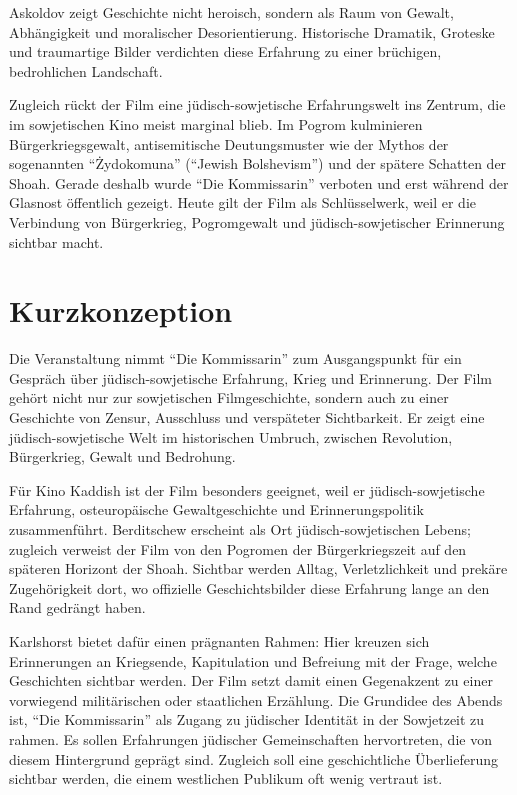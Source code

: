 \documentclass[11pt,a4paper]{article}
\begin{document}
Askoldov zeigt Geschichte nicht heroisch, sondern als Raum von Gewalt, Abh\"angigkeit und moralischer Desorientierung. Historische Dramatik, Groteske und traumartige Bilder verdichten diese Erfahrung zu einer br\"uchigen, bedrohlichen Landschaft.

Zugleich r\"uckt der Film eine j\"udisch-sowjetische Erfahrungswelt ins Zentrum, die im sowjetischen Kino meist marginal blieb. Im Pogrom kulminieren B\"urgerkriegsgewalt, antisemitische Deutungsmuster wie der Mythos der sogenannten \enquote{\.Zydokomuna} (\enquote{Jewish Bolshevism}) und der sp\"atere Schatten der Shoah. Gerade deshalb wurde \enquote{Die Kommissarin} verboten und erst w\"ahrend der Glasnost \"offentlich gezeigt. Heute gilt der Film als Schl\"usselwerk, weil er die Verbindung von B\"urgerkrieg, Pogromgewalt und j\"udisch-sowjetischer Erinnerung sichtbar macht.

\section*{Kurzkonzeption}

Die Veranstaltung nimmt \enquote{Die Kommissarin} zum Ausgangspunkt f\"ur ein Gespr\"ach \"uber j\"udisch-sowjetische Erfahrung, Krieg und Erinnerung. Der Film geh\"ort nicht nur zur sowjetischen Filmgeschichte, sondern auch zu einer Geschichte von Zensur, Ausschluss und versp\"ateter Sichtbarkeit. Er zeigt eine j\"udisch-sowjetische Welt im historischen Umbruch, zwischen Revolution, B\"urgerkrieg, Gewalt und Bedrohung.

F\"ur Kino Kaddish ist der Film besonders geeignet, weil er j\"udisch-sowjetische Erfahrung, osteurop\"aische Gewaltgeschichte und Erinnerungspolitik zusammenf\"uhrt. Berditschew erscheint als Ort j\"udisch-sowjetischen Lebens; zugleich verweist der Film von den Pogromen der B\"urgerkriegszeit auf den sp\"ateren Horizont der Shoah. Sichtbar werden Alltag, Verletzlichkeit und prek\"are Zugeh\"origkeit dort, wo offizielle Geschichtsbilder diese Erfahrung lange an den Rand gedr\"angt haben.

Karlshorst bietet daf\"ur einen pr\"agnanten Rahmen: Hier kreuzen sich Erinnerungen an Kriegsende, Kapitulation und Befreiung mit der Frage, welche Geschichten sichtbar werden. Der Film setzt damit einen Gegenakzent zu einer vorwiegend milit\"arischen oder staatlichen Erz\"ahlung. Die Grundidee des Abends ist, \enquote{Die Kommissarin} als Zugang zu j\"udischer Identit\"at in der Sowjetzeit zu rahmen. Es sollen Erfahrungen j\"udischer Gemeinschaften hervortreten, die von diesem Hintergrund gepr\"agt sind. Zugleich soll eine geschichtliche \"Uberlieferung sichtbar werden, die einem westlichen Publikum oft wenig vertraut ist.
\end{document}
